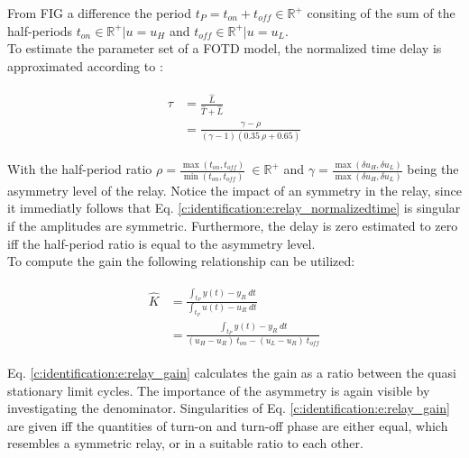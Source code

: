 From FIG a difference the period $t_P = t_{on} + t_{off}\in \mathbb{R}^+$ consiting of the sum of the half-periods $t_{on} \in \mathbb{R}^+ | u = u_H$ and $t_{off} \in \mathbb{R}^+ | u = u_L$.\\

To estimate the parameter set of a FOTD model, the normalized time delay is approximated according to \cite[p.26 f.]{Berner2015}:

\begin{align}
\begin{split}
\tau &= \frac{\hat{L}}{\hat{T}+\hat{L}} \\
 &= \frac{\gamma - \rho}{ \left(\gamma - 1\right)\left(0.35~\rho+0.65\right)}
\end{split}
\label{c:identification:e:relay_normalizedtime}
\end{align}

With the half-period ratio $\rho = \frac{\max\left(t_{on},t_{off} \right)}{\min\left(t_{on},t_{off} \right)} ~\in \mathbb{R}^+$ and $\gamma = \frac{\max\left(\delta u_H, \delta u_L \right)}{\max\left(\delta u_H, \delta u_L \right)}$ being the asymmetry level of the relay. Notice the impact of an symmetry in the relay, since it immediatly follows that Eq. \ref{c:identification:e:relay_normalizedtime} is singular if the amplitudes are symmetric. Furthermore, the delay is zero estimated to zero iff the half-period ratio is equal to the asymmetry level.\\

To compute the gain the following relationship can be utilized:

\begin{align}
\begin{split}
\hat{K} &= \frac{\int_{t_P} y(t)-y_R~dt}{\int_{t_P} u(t)-u_R~dt} \\
&= \frac{\int_{t_P} y(t)-y_R~dt}{ \left( u_H -u_R \right)~t_{on} - \left( u_L - u_R \right)~t_{off}} 
\end{split}
\label{c:identification:e:relay_gain}
\end{align}

Eq. \ref{c:identification:e:relay_gain} calculates the gain as a ratio between the quasi stationary limit cycles. The importance of the asymmetry is again visible by investigating the denominator. Singularities of Eq. \ref{c:identification:e:relay_gain} are given iff the quantities of turn-on and turn-off phase are either equal, which resembles a symmetric relay, or in a suitable ratio to each other.\\

